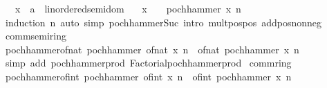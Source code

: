 \begin{isabellebody}
\ \ \ x\ {\isacharcolon}{\kern0pt}{\isacharcolon}{\kern0pt}\ {\isachardoublequoteopen}{\isacharprime}{\kern0pt}a\ {\isacharcolon}{\kern0pt}{\isacharcolon}{\kern0pt}\ linordered{\isacharunderscore}{\kern0pt}semidom{\isachardoublequoteclose}\isanewline
\ \ \ {\isachardoublequoteopen}x\ {\isachargreater}{\kern0pt}\ {}\ {\isasymLongrightarrow}\ pochhammer\ x\ n\ {\isachargreater}{\kern0pt}\ {}{\isachardoublequoteclose}\isanewline
%
\isadelimproof
\ \ %
\endisadelimproof
%
\isatagproof
{}\isamarkupfalse%
\ {\isacharparenleft}{\kern0pt}induction\ n{\isacharparenright}{\kern0pt}\ {\isacharparenleft}{\kern0pt}auto\ simp{\isacharcolon}{\kern0pt}\ pochhammer{\isacharunderscore}{\kern0pt}Suc\ intro{\isacharbang}{\kern0pt}{\isacharcolon}{\kern0pt}\ mult{\isacharunderscore}{\kern0pt}pos{\isacharunderscore}{\kern0pt}pos\ add{\isacharunderscore}{\kern0pt}pos{\isacharunderscore}{\kern0pt}nonneg{\isacharparenright}{\kern0pt}%
\endisatagproof
{\isafoldproof}%
%
\isadelimproof
\isanewline
%
\endisadelimproof
\isanewline
{}\isamarkupfalse%
\ comm{\isacharunderscore}{\kern0pt}semiring{\isacharunderscore}{\kern0pt}{}\isanewline
{}\isanewline
\isanewline
{}\isamarkupfalse%
\ pochhammer{\isacharunderscore}{\kern0pt}of{\isacharunderscore}{\kern0pt}nat{\isacharcolon}{\kern0pt}\ {\isachardoublequoteopen}pochhammer\ {\isacharparenleft}{\kern0pt}of{\isacharunderscore}{\kern0pt}nat\ x{\isacharparenright}{\kern0pt}\ n\ {\isacharequal}{\kern0pt}\ of{\isacharunderscore}{\kern0pt}nat\ {\isacharparenleft}{\kern0pt}pochhammer\ x\ n{\isacharparenright}{\kern0pt}{\isachardoublequoteclose}\isanewline
%
\isadelimproof
\ \ %
\endisadelimproof
%
\isatagproof
{}\isamarkupfalse%
\ {\isacharparenleft}{\kern0pt}simp\ add{\isacharcolon}{\kern0pt}\ pochhammer{\isacharunderscore}{\kern0pt}prod\ Factorial{\isachardot}{\kern0pt}pochhammer{\isacharunderscore}{\kern0pt}prod{\isacharparenright}{\kern0pt}%
\endisatagproof
{\isafoldproof}%
%
\isadelimproof
\isanewline
%
\endisadelimproof
\isanewline
{}\isamarkupfalse%
\isanewline
\isanewline
{}\isamarkupfalse%
\ comm{\isacharunderscore}{\kern0pt}ring{\isacharunderscore}{\kern0pt}{}\isanewline
{}\isanewline
\isanewline
{}\isamarkupfalse%
\ pochhammer{\isacharunderscore}{\kern0pt}of{\isacharunderscore}{\kern0pt}int{\isacharcolon}{\kern0pt}\ {\isachardoublequoteopen}pochhammer\ {\isacharparenleft}{\kern0pt}of{\isacharunderscore}{\kern0pt}int\ x{\isacharparenright}{\kern0pt}\ n\ {\isacharequal}{\kern0pt}\ of{\isacharunderscore}{\kern0pt}int\ {\isacharparenleft}{\kern0pt}pochhammer\ x\ n{\isacharparenright}{\kern0pt}{\isachardoublequoteclose}\isanewline

\end{isabellebody}
